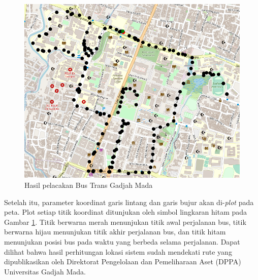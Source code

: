 \begin{figure}[H]
	\centering
	\includegraphics[width=12cm]{contents/chapter-4/pengujian-bergerak/tracked-route.png}
	\caption{Hasil pelacakan Bus Trans Gadjah Mada}
	\label{Fig: moving-tracked-route}
\end{figure}

Setelah itu, parameter koordinat garis lintang dan garis bujur akan di-\textit{plot} pada peta. Plot setiap titik koordinat ditunjukan oleh simbol lingkaran hitam pada Gambar \ref{Fig: moving-tracked-route}. Titik berwarna merah menunjukan titik awal perjalanan bus, titik berwarna hijau menunjukan titik akhir perjalanan bus, dan titik hitam menunjukan posisi bus pada waktu yang berbeda selama perjalanan. Dapat dilihat bahwa hasil perhitungan lokasi sistem sudah mendekati rute yang dipublikasikan oleh Direktorat Pengelolaan dan Pemeliharaan Aset (DPPA) Universitas Gadjah Mada.

\newpage

